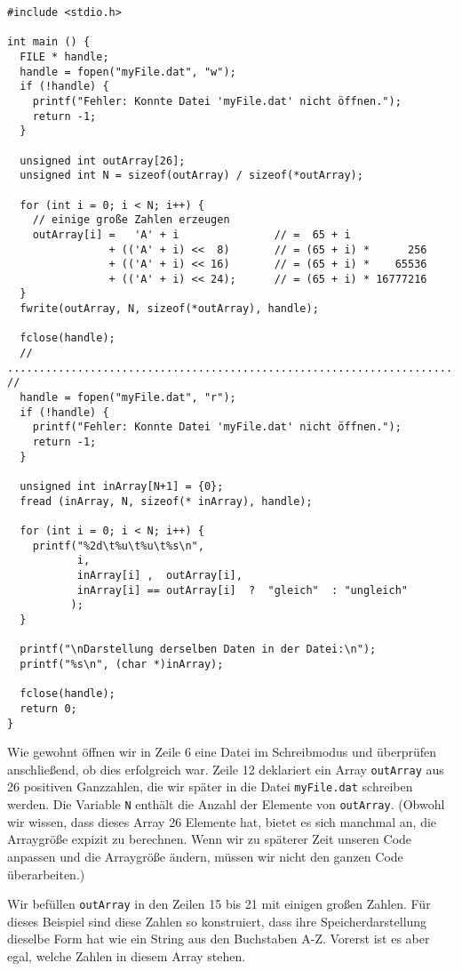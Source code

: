 \begin{codebox}
\begin{verbatim}
#include <stdio.h>

int main () {
  FILE * handle;
  handle = fopen("myFile.dat", "w");
  if (!handle) {
    printf("Fehler: Konnte Datei 'myFile.dat' nicht öffnen.");
    return -1;
  }
  
  unsigned int outArray[26];
  unsigned int N = sizeof(outArray) / sizeof(*outArray);
  
  for (int i = 0; i < N; i++) {
    // einige große Zahlen erzeugen
    outArray[i] =   'A' + i               // =  65 + i
                + (('A' + i) <<  8)       // = (65 + i) *      256
                + (('A' + i) << 16)       // = (65 + i) *    65536
                + (('A' + i) << 24);      // = (65 + i) * 16777216
  }
  fwrite(outArray, N, sizeof(*outArray), handle);
  
  fclose(handle);
  // ....................................................................... //
  handle = fopen("myFile.dat", "r");
  if (!handle) {
    printf("Fehler: Konnte Datei 'myFile.dat' nicht öffnen.");
    return -1;
  }
  
  unsigned int inArray[N+1] = {0};
  fread (inArray, N, sizeof(* inArray), handle);
  
  for (int i = 0; i < N; i++) {
    printf("%2d\t%u\t%u\t%s\n", 
           i, 
           inArray[i] ,  outArray[i],
           inArray[i] == outArray[i]  ?  "gleich"  : "ungleich"
          );
  }
  
  printf("\nDarstellung derselben Daten in der Datei:\n");
  printf("%s\n", (char *)inArray);
  
  fclose(handle);
  return 0;
}
\end{verbatim}
\end{codebox}

Wie gewohnt öffnen wir in Zeile 6 eine Datei im Schreibmodus und überprüfen anschließend, ob dies erfolgreich war. Zeile 12 deklariert ein Array \texttt{outArray} aus 26 positiven Ganzzahlen, die wir später in die Datei \texttt{myFile.dat} schreiben werden. Die Variable \texttt{N} enthält die Anzahl der Elemente von \texttt{outArray}. (Obwohl wir wissen, dass dieses Array 26 Elemente hat, bietet es sich manchmal an, die Arraygröße expizit zu berechnen. Wenn wir zu späterer Zeit unseren Code anpassen und die Arraygröße ändern, müssen wir nicht den ganzen Code überarbeiten.) 

Wir befüllen \texttt{outArray} in den Zeilen 15 bis 21 mit einigen großen Zahlen. Für dieses Beispiel sind diese Zahlen so konstruiert, dass ihre Speicherdarstellung dieselbe Form hat wie ein String aus den Buchstaben A-Z. Vorerst ist es aber egal, welche Zahlen in diesem Array stehen.

